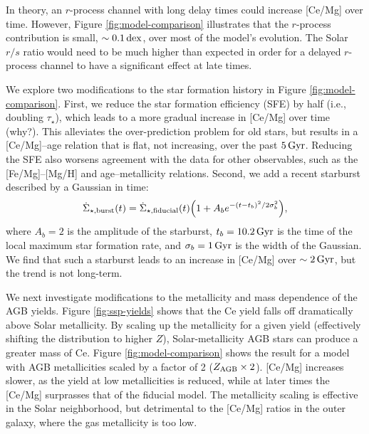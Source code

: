 \documentclass[twocolumn,twocolappendix]{aastex701}
\newcommand{\todo}[1]{{\color{red}#1}}
\newcommand{\Gyr}{\,{\rm Gyr}}
\newcommand{\dex}{\,{\rm dex}}
\begin{document}
In theory, an $r$-process channel with long delay times could increase [Ce/Mg] over time. However, Figure \ref{fig:model-comparison} illustrates that the $r$-process contribution is small, $\sim0.1\dex$, over most of the model's evolution. The Solar $r/s$ ratio would need to be much higher than expected in order for a delayed $r$-process channel to have a significant effect at late times.

We explore two modifications to the star formation history in Figure \ref{fig:model-comparison}. First, we reduce the star formation efficiency (SFE) by half (i.e., doubling $\tau_\star$), which leads to a more gradual increase in [Ce/Mg] over time \todo{(why?)}. This alleviates the over-prediction problem for old stars, but results in a [Ce/Mg]--age relation that is flat, not increasing, over the past $5\Gyr$. Reducing the SFE also worsens agreement with the data for other observables, such as the [Fe/Mg]--[Mg/H] and age--metallicity relations. Second, we add a recent starburst described by a Gaussian in time:
\begin{equation}
    \dot\Sigma_{\rm \star, burst}(t) = \dot\Sigma_{\rm \star,fiducial}(t) \Big(1 + A_b e^{-(t-t_b)^2/2\sigma^2_b}\Big),
\end{equation}
where $A_b=2$ is the amplitude of the starburst, $t_b=10.2\Gyr$ is the time of the local maximum star formation rate, and $\sigma_b=1\Gyr$ is the width of the Gaussian. We find that such a starburst leads to an increase in [Ce/Mg] over $\sim2\Gyr$, but the trend is not long-term.

We next investigate modifications to the metallicity and mass dependence of the AGB yields. Figure \ref{fig:ssp-yields} shows that the Ce yield falls off dramatically above Solar metallicity. By scaling up the metallicity for a given yield (effectively shifting the distribution to higher $Z$), Solar-metallicity AGB stars can produce a greater mass of Ce. Figure \ref{fig:model-comparison} shows the result for a model with AGB metallicities scaled by a factor of 2 ($Z_{\rm AGB}\times2$). [Ce/Mg] increases slower, as the yield at low metallicities is reduced, while at later times the [Ce/Mg] surprasses that of the fiducial model. The metallicity scaling is effective in the Solar neighborhood, but detrimental to the [Ce/Mg] ratios in the outer galaxy, where the gas metallicity is too low.
\end{document}
